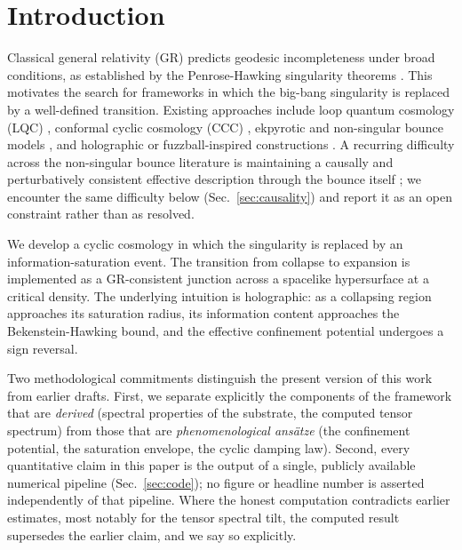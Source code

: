 \documentclass[reprint,superscriptaddress,amsmath,amssymb,aps,prd,showkeys,nofootinbib]{revtex4-2}
\begin{document}

\maketitle

\section{Introduction}

Classical general relativity (GR) predicts geodesic incompleteness under broad conditions,
as established by the Penrose-Hawking singularity theorems \cite{Penrose1965,
HawkingPenrose1970}. This motivates the search for frameworks in which the big-bang
singularity is replaced by a well-defined transition. Existing approaches include loop
quantum cosmology (LQC) \cite{AshtekarBojowald2006}, conformal cyclic cosmology (CCC)
\cite{PenroseBook}, ekpyrotic and non-singular bounce models
\cite{SteinhardtTurok2002, IjjasSteinhardt2018, KoehnLehnersOvrut2016}, and holographic or
fuzzball-inspired constructions \cite{tHooft1993, Susskind1995, Bousso1999}. A recurring
difficulty across the non-singular bounce literature is maintaining a causally and
perturbatively consistent effective description through the bounce itself
\cite{KoehnLehnersOvrut2016}; we encounter the same difficulty below
(Sec.~\ref{sec:causality}) and report it as an open constraint rather than as resolved.

We develop a cyclic cosmology in which the singularity is replaced by an
information-saturation event. The transition from collapse to expansion is implemented as a
GR-consistent junction across a spacelike hypersurface at a critical density. The underlying
intuition is holographic: as a collapsing region approaches its saturation radius, its
information content approaches the Bekenstein-Hawking bound, and the effective confinement
potential undergoes a sign reversal.

Two methodological commitments distinguish the present version of this work from earlier
drafts. First, we separate explicitly the components of
the framework that are \emph{derived} (spectral properties of the substrate, the computed
tensor spectrum) from those that are \emph{phenomenological ans\"atze} (the confinement
potential, the saturation envelope, the cyclic damping law). Second, every quantitative
claim in this paper is the output of a single, publicly available numerical pipeline
(Sec.~\ref{sec:code}); no figure or headline number is asserted independently of that
pipeline. Where the honest computation contradicts earlier estimates, most notably for
the tensor spectral tilt, the computed result supersedes the earlier claim, and we say
so explicitly.
\end{document}
